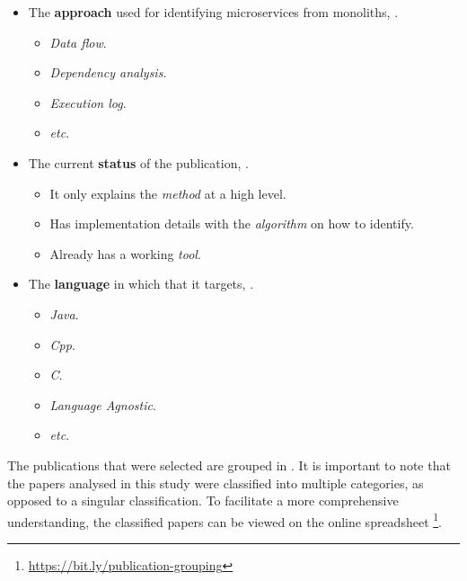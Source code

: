 \begin{itemize}
  \item The \textbf{approach} used for identifying microservices from
    monoliths, .
  \begin{itemize}
    \item \textit{Data flow}.
    \item \textit{Dependency analysis}.
    \item \textit{Execution log}.
    \item \textit{etc}.
  \end{itemize}
  \item The current \textbf{status} of the publication,
    .
  \begin{itemize}
    \item It only explains the \textit{method} at a high level.
    \item Has implementation details with the \textit{algorithm} on how to
      identify.
    \item Already has a working \textit{tool}.
  \end{itemize}
  \item The \textbf{language} in which that it targets,
    .
  \begin{itemize}
    \item \textit{Java}.
    \item \textit{Cpp}.
    \item \textit{C}.
    \item \textit{Language Agnostic}.
    \item \textit{etc}.
  \end{itemize}
\end{itemize}

The publications that were selected are grouped in
. It is
important to note that the papers analysed in this study were classified into
multiple categories, as opposed to a singular classification. To facilitate a
more comprehensive understanding, the classified papers can be viewed on the
online spreadsheet \footnote{\url{https://bit.ly/publication-grouping}}.

